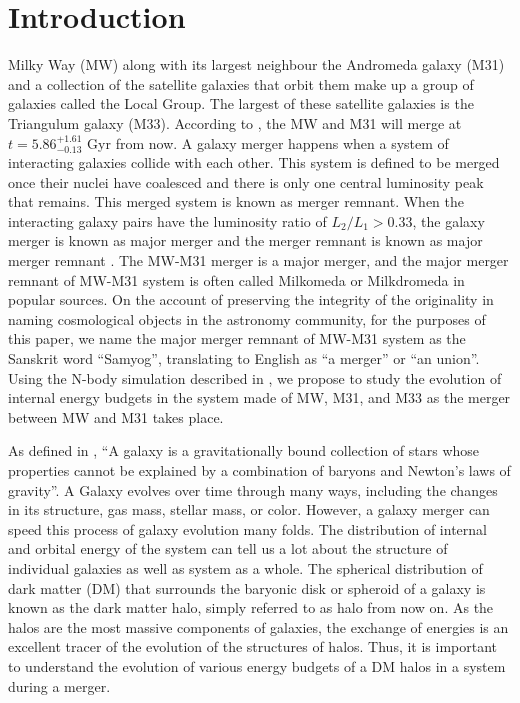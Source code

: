 \documentclass[twocolumn]{aastex631}
\begin{document}

\section{Introduction}
\label{sec:intro}
Milky Way (MW) along with its largest neighbour the Andromeda galaxy (M31) and a collection of the satellite galaxies that orbit them make up a group of galaxies called the Local Group. The largest of these satellite galaxies is the Triangulum galaxy (M33). According to \cite{simulation}, the MW and M31 will merge at $t = 5.86^{+1.61}_{-0.13}$ Gyr from now. A galaxy merger happens when a system of interacting galaxies collide with each other. This system is defined to be merged once their nuclei have coalesced and there is only one central luminosity peak that remains. This merged system is known as merger remnant. When the interacting galaxy pairs have the luminosity ratio of $L_2/L_1 > 0.33$, the galaxy merger is known as major merger and the merger remnant is known as major merger remnant \citep{major_merger_def}. The MW-M31 merger is a major merger, and the major merger remnant of MW-M31 system is often called Milkomeda or Milkdromeda in popular sources. On the account of preserving the integrity of the originality in naming cosmological objects in the astronomy community, for the purposes of this paper, we name the major merger remnant of MW-M31 system as the Sanskrit word ``Samyog'', translating to English as ``a merger'' or ``an union''. Using the N-body simulation described in \cite{simulation}, we propose to study the evolution of internal energy budgets in the system made of MW, M31, and M33 as the merger between MW and M31 takes place. 

As defined in \cite{galaxy_def}, ``A galaxy is a gravitationally bound collection of stars whose properties cannot be explained by a combination of baryons and Newton’s laws of gravity''. A Galaxy evolves over time through many ways, including the changes in its structure, gas mass, stellar mass, or color. However, a galaxy merger can speed this process of galaxy evolution many folds. The distribution of internal and orbital energy of the system can tell us a lot about the structure of individual galaxies as well as system as a whole. The spherical distribution of dark matter (DM) that surrounds the baryonic disk or spheroid of a galaxy is known as the dark matter halo, simply referred to as halo from now on. As the halos are the most massive components of galaxies, the exchange of energies is an excellent tracer of the evolution of the structures of halos. Thus, it is important to understand the evolution of various energy budgets of a DM halos in a system during a merger. 
\end{document}
